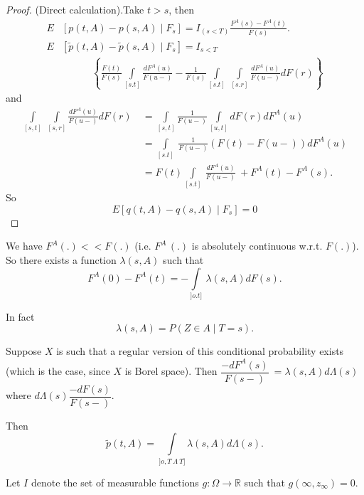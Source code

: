 \begin{proof}
  (Direct calculation).\pageoriginale Take $ t > s $, then   
  \begin{align*}
    E & [ p(t,A) - p (s,A)  \mid F_s ] = I_{(s < T)} \frac{ F^A (s) -
      F^A (t)}{F(s)}.\\ 
    E & [ \tilde{p}(t,A) - \tilde{p} (s,A)  \mid F_s ] = I_{s < T }\\ 
    & \qquad \quad\left\{\frac{F (t)}{F (s)} \int \limits_{[s.t ]}
    \frac{dF^A (u)}{F (u-)}  - \frac{1}{F (s)} \int \limits_{[s.t ]}
    ~ \int \limits_{[s.r]} \frac{ dF^A (u)}{F (u-)} dF (r) \right\} 
\end{align*}
and
\begin{align*}
  \int \limits_{[ s,t ]} ~ \int \limits_{[ s,r ]} \frac{ dF^A (u)}{F
    (u-)}dF(r) ~ &= \int\limits_{[s, t]}\frac{1}{F (u-)} \int
  \limits_{[ u,t ]} dF (r) dF^A (u)\\ 
  &= \int \limits_{[ s.t ]} ~  \frac{1}{F (u-)} (F (t) - F
  (u-)) dF^A (u) \\ 
  &= F (t) \int \limits_{[ s.t ]} ~ \frac{ dF^A (u)}{F (u-)} ~ +  F^A
  (t) - F^A (s). 
\end{align*}
So
$$
E [ q (t, A) - q (s, A) \mid  F_s ]  = 0 
$$
\end{proof}


\medskip
{}
 We have $ F^A (.) <<  F
(.)$  (i.e. $F^A\, (.)$ is absolutely continuous  w.r.t. $F (.)$). So
there exists a function $\lambda (s,A)$ such that  
$$
F^A (0) - F^A (t) = - \int \limits_{] o.t ]} ~ \lambda (s,A ) d F (s). 
$$

In fact
$$
\lambda (s,A) = P (Z \in  A  \mid T  = s ).
$$

Suppose $X$ is such that a regular version of this conditional
probability exists (which is the case, since $X$ is Borel
space). Then $ \dfrac{- dF^A (s)}{F (s-)} ~ = \lambda (s,A) d \Lambda
(s) $ 
where $ d \Lambda (s)  \dfrac{- dF (s)}{F (s-)} $. 

Then  
$$
\tilde{p} (t,A) =  \int \limits_{] o, T ~ \Lambda ~ T ]}  \lambda
    (s,A) d \Lambda (s). 
$$

\medskip
{}\pageoriginale

Let  $I$ denote the set of measurable functions $ g : \Omega
\rightarrow \mathbb{R} $ such that  $ g ( \infty, z_\infty ) = 0 $. 

